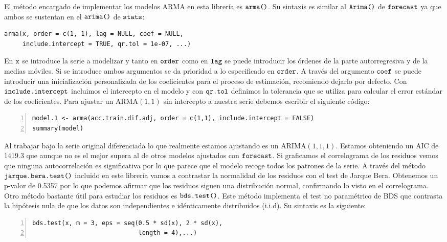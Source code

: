 El método encargado de implementar los modelos ARMA en esta librería es $\verb!arma()!$. Su sintaxis es similar al $\verb!Arima()!$ de $\verb!forecast!$ ya que ambos se sustentan en el $\verb!arima()!$ de $\verb!stats!$:
\begin{Verbatim}[fontsize=\footnotesize]
arma(x, order = c(1, 1), lag = NULL, coef = NULL,
     include.intercept = TRUE, qr.tol = 1e-07, ...)
\end{Verbatim}

En $\verb!x!$ se introduce la serie a modelizar y tanto en $\verb!order!$ como en $\verb!lag!$ se puede introducir los órdenes de la parte autorregresiva y de la medias móviles. Si se introduce ambos argumentos se da prioridad a lo especificado en $\verb!order!$. A través del argumento $\verb!coef!$ se puede introducir una inicialización personalizada de los coeficientes para el proceso de estimación, recomiendo dejarlo por defecto. Con $\verb!include.intercept!$ incluimos el intercepto en el modelo y con $\verb!qr.tol!$ definimos la tolerancia que se utiliza para calcular el error estándar de los coeficientes. Para ajustar un ARMA$(1,1)$ sin intercepto a nuestra serie debemos escribir el siguiente código:
\begin{Verbatim}[fontsize=\footnotesize, numbers = left]
model.1 <- arma(acc.train.dif.adj, order = c(1,1), include.intercept = FALSE)
summary(model)
\end{Verbatim}

Al trabajar bajo la serie original diferenciada lo que realmente estamos ajustando es un ARIMA$(1,1,1)$. Estamos obteniendo un AIC de 1419.3 que aunque no es el mejor supera al de otros modelos ajustados con $\verb!forecast!$. Si graficamos el correlograma de los residuos vemos que ninguna autocorrelación es significativa por lo que parece que el modelo recoge todos los patrones de la serie. A través del método $\verb!jarque.bera.test()!$ incluido en este librería vamos a contrastar la normalidad de los residuos con el test de Jarque Bera. Obtenemos un p-valor de 0.5357 por lo que podemos afirmar que los residuos siguen una distribución normal, confirmando lo visto en el correlograma.  Otro método bastante útil para estudiar los residuos es $\verb!bds.test()!$. Este método implementa el test no paramétrico de BDS que contrasta la hipótesis nula de que los datos son independientes e idénticamente distribuidos (i.i.d). Su sintaxis es la siguiente:
\begin{Verbatim}[fontsize=\footnotesize, numbers = left]
bds.test(x, m = 3, eps = seq(0.5 * sd(x), 2 * sd(x),
                             length = 4),...)
\end{Verbatim}

